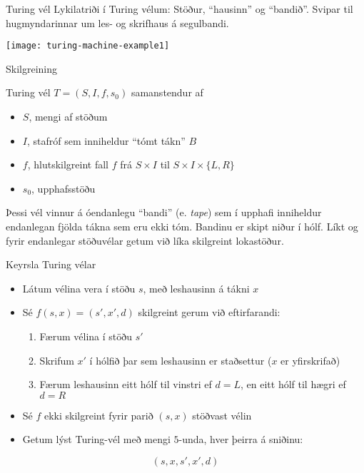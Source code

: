 \documentclass{beamer}
\begin{document}
\begin{frame}{Turing vél}
Lykilatriði í Turing vélum: Stöður, ``hausinn'' og ``bandið''. Svipar til hugmyndarinnar um les- og skrifhaus á segulbandi.
\begin{center}
\texttt{[image: turing-machine-example1]}
\end{center}
\end{frame}

\begin{frame}{Skilgreining}
\begin{tcolorbox}[title=Turing vél]
Turing vél $T = (S, I, f, s_0)$ samanstendur af
\begin{itemize}
 \item $S$, mengi af stöðum
 \item $I$, stafróf sem inniheldur ``tómt tákn'' $B$
 \item $f$, hlutskilgreint fall $f$ frá $S \times I$ til $S \times I \times \{L, R\}$
 \item $s_0$, upphafsstöðu
\end{itemize}
\end{tcolorbox}
Þessi vél vinnur á óendanlegu ``bandi'' (e. \emph{tape}) sem í upphafi inniheldur endanlegan fjölda tákna sem eru ekki tóm. Bandinu er skipt niður í hólf. Líkt og fyrir endanlegar stöðuvélar getum við líka skilgreint lokastöður.
\end{frame}

\begin{frame}{Keyrsla Turing vélar}
\begin{itemize}
 \item Látum vélina vera í stöðu $s$, með leshausinn á tákni $x$
 \item Sé $f(s,x) = (s',x',d)$ skilgreint gerum við eftirfarandi:
 \begin{enumerate}
  \item Færum vélina í stöðu $s'$
  \item Skrifum $x'$ í hólfið þar sem leshausinn er staðsettur ($x$ er yfirskrifað)
  \item Færum leshausinn eitt hólf til vinstri ef $d = L$, en eitt hólf til hægri ef $d = R$
 \end{enumerate}
 \item Sé $f$ ekki skilgreint fyrir parið $(s,x)$ stöðvast vélin
 \item Getum lýst Turing-vél með mengi $5$-unda, hver þeirra á sniðinu:
\end{itemize}
\[(s, x, s' , x' , d)\]
\end{frame}
\end{document}
